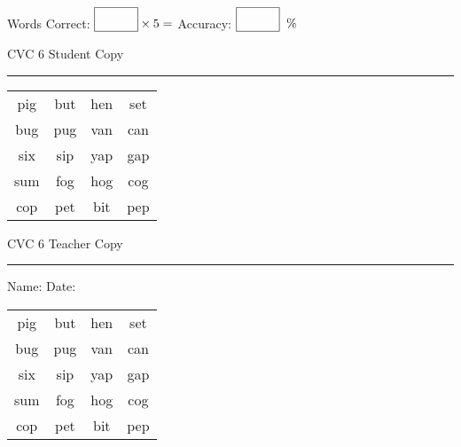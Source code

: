\documentclass{memoir}
\begin{document}
\normalsize

Words Correct: $\fbox{\phantom{\huge 100}} \times 5 = $ Accuracy: $\fbox{\phantom{\huge 100}}\;\; \%$ 

\vfill

\newpage


\footnotesize \noindent
CVC 6 \hfill Student Copy
\smallskip
\hrule

\huge

\setlength{\tabcolsep}{14pt}
\def\arraystretch{2}

{\selectfont


\begin{vplace}[0.5]
\begin{center}
\begin{tabular}{cccc}
pig & but & hen & set \\
bug & pug & van & can \\
six & sip & yap & gap \\
sum & fog & hog & cog \\
cop & pet & bit & pep \\
\end{tabular}
\end{center}
\end{vplace}

}

\newpage

\footnotesize \noindent
CVC 6 \hfill Teacher Copy
\smallskip
\hrule

\normalsize

\vfill

\noindent
Name: \underline{\hspace{1.75in}} \hfill Date: \underline{\hspace{1in}}

\huge

{\selectfont


\begin{vplace}[0.5]
\begin{center}
\begin{tabular}{cccc}
pig & but & hen & set \\
bug & pug & van & can \\
six & sip & yap & gap \\
sum & fog & hog & cog \\
cop & pet & bit & pep \\
\end{tabular}
\end{center}
\end{vplace}



}
\end{document}

